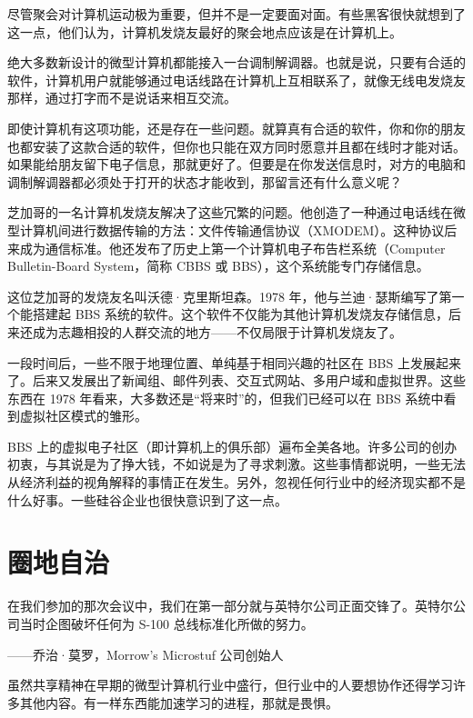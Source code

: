 \documentclass[12pt,UTF8]{ctexbook}
\begin{document}
尽管聚会对计算机运动极为重要，但并不是一定要面对面。有些黑客很快就想到了这一点，他们认为，计算机发烧友最好的聚会地点应该是在计算机上。

绝大多数新设计的微型计算机都能接入一台调制解调器。也就是说，只要有合适的软件，计算机用户就能够通过电话线路在计算机上互相联系了，就像无线电发烧友那样，通过打字而不是说话来相互交流。

即使计算机有这项功能，还是存在一些问题。就算真有合适的软件，你和你的朋友也都安装了这款合适的软件，但你也只能在双方同时愿意并且都在线时才能对话。如果能给朋友留下电子信息，那就更好了。但要是在你发送信息时，对方的电脑和调制解调器都必须处于打开的状态才能收到，那留言还有什么意义呢？

芝加哥的一名计算机发烧友解决了这些冗繁的问题。他创造了一种通过电话线在微型计算机间进行数据传输的方法：文件传输通信协议（XMODEM）。这种协议后来成为通信标准。他还发布了历史上第一个计算机电子布告栏系统（Computer Bulletin-Board System，简称 CBBS 或 BBS），这个系统能专门存储信息。

这位芝加哥的发烧友名叫沃德·克里斯坦森。1978 年，他与兰迪·瑟斯编写了第一个能搭建起 BBS 系统的软件。这个软件不仅能为其他计算机发烧友存储信息，后来还成为志趣相投的人群交流的地方——不仅局限于计算机发烧友了。

一段时间后，一些不限于地理位置、单纯基于相同兴趣的社区在 BBS 上发展起来了。后来又发展出了新闻组、邮件列表、交互式网站、多用户域和虚拟世界。这些东西在 1978 年看来，大多数还是“将来时”的，但我们已经可以在 BBS 系统中看到虚拟社区模式的雏形。

BBS 上的虚拟电子社区（即计算机上的俱乐部）遍布全美各地。许多公司的创办初衷，与其说是为了挣大钱，不如说是为了寻求刺激。这些事情都说明，一些无法从经济利益的视角解释的事情正在发生。另外，忽视任何行业中的经济现实都不是什么好事。一些硅谷企业也很快意识到了这一点。





\section{圈地自治}


在我们参加的那次会议中，我们在第一部分就与英特尔公司正面交锋了。英特尔公司当时企图破坏任何为 S-100 总线标准化所做的努力。

——乔治·莫罗，Morrow's Microstuf 公司创始人



虽然共享精神在早期的微型计算机行业中盛行，但行业中的人要想协作还得学习许多其他内容。有一样东西能加速学习的进程，那就是畏惧。
\end{document}
